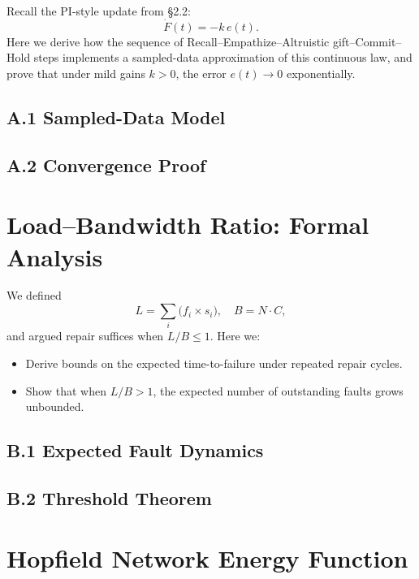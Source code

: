 \documentclass{book}       %
\begin{document}
Recall the PI-style update from §2.2:
\[
\dot{F}(t) = -k\,e(t).
\]
Here we derive how the sequence of Recall–Empathize–Altruistic gift–Commit–Hold
steps implements a sampled-data approximation of this continuous law,
and prove that under mild gains $k>0$, the error $e(t)\to0$ exponentially.

\section*{A.1  Sampled-Data Model}

\section*{A.2  Convergence Proof}

\chapter{Load–Bandwidth Ratio: Formal Analysis}
\label{app:loadband}

We defined
\[
L = \sum_i \bigl(f_i \times s_i\bigr),\quad
B = N\cdot C,
\]
and argued repair suffices when $L/B\le1$. Here we:

\begin{itemize}[noitemsep]
  \item Derive bounds on the expected time-to-failure under repeated repair cycles.
  \item Show that when $L/B>1$, the expected number of outstanding faults grows unbounded.
\end{itemize}

\section*{B.1  Expected Fault Dynamics}

\section*{B.2  Threshold Theorem}

\chapter{Hopfield Network Energy Function}
\label{app:hopfield}
\end{document}
